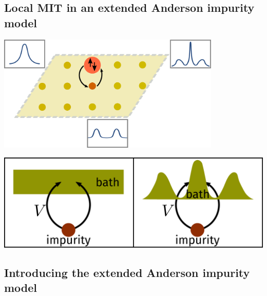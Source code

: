 \documentclass[9pt,aspectratio=169]{beamer}
\begin{document}
\begin{frame}{}
\section{Local MIT in an extended Anderson impurity model}

\begin{minipage}{0.5\textwidth}
\includegraphics[width=0.8\textwidth]{DMFT.pdf}
\end{minipage}
\hspace*{\fill}
\begin{minipage}{0.45\textwidth}
\includegraphics[width=\textwidth]{dos_diff.pdf}
\end{minipage}

\end{frame}

\begin{frame}{}
\section{Introducing the extended Anderson impurity model}
\end{frame}
\end{document}
